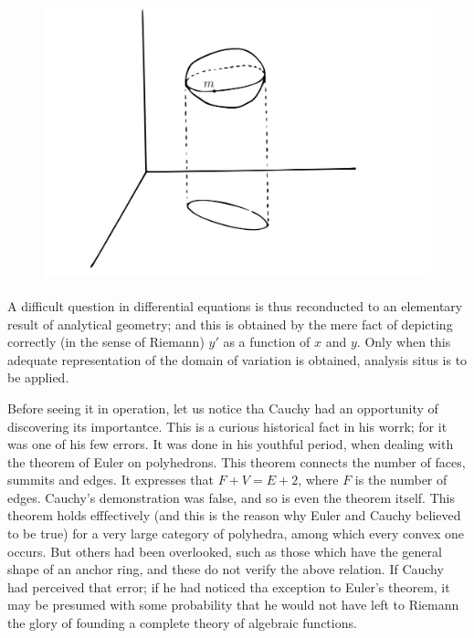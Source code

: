 \documentclass[12pt,oneside]{book}
\begin{document}
\begin{figure}
    \centering
    \includegraphics[height=8cm]{Fig6.jpeg}
    \label{Fig6}
\end{figure}

A difficult question in differential equations is thus reconducted to an elementary result of analytical geometry; and this is obtained by the mere fact of depicting correctly (in the sense of Riemann) $y'$ as a function of $x$ and $y$. Only when this adequate representation of the domain of variation is obtained, analysis situs is to be applied. \par 

Before seeing it in operation, let us notice tha Cauchy had an opportunity of discovering its importantce. This is a curious historical fact in his worrk; for it was one of his few errors. It was done in his youthful period, when dealing with the theorem of Euler on polyhedrons. This theorem connects the number of faces, summits and edges. It expresses that $F+V=E+2$, where $F$ is the number of edges. Cauchy's demonstration was false, and so is even the theorem itself. This theorem holds efffectively (and this is the reason why Euler and Cauchy believed to be true) for a very large category of polyhedra, among which every convex one occurs. But others had been overlooked, such as those which have the general shape of an anchor ring, and these do not verify the above relation. If Cauchy had perceived that error; if he had noticed tha exception to Euler's theorem, it may be presumed with some probability that he would not have left to Riemann the glory of founding a complete theory of algebraic functions. \par 
\end{document}
